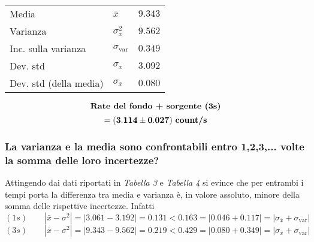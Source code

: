 \documentclass{article}
\begin{document}
\begin{minipage}[c]{0.4\textwidth}
\begin{center}
\begin{tabular}{llr}
	Media                       & $\bar{x}$             & $9.343$       \\		
	Varianza                    & $\sigma_{x}^2$          & $9.562$     \\
	Inc. sulla varianza   & $\sigma_{\text{var}}$   & $0.349$		 \\
	Dev. std                    & $\sigma_{x}$              & $3.092$   \\
	Dev. std (della media)      & $\sigma_{\bar{x}}$    & $0.080$       \\
\end{tabular}
\end{center}
\vspace{1cm}
\[ 
	\text{\textbf{Rate del fondo + sorgente (3s)}}
\]
\[
	\mathbf{=  \left(3.114 \pm 0.027\right)} \text{ \textbf{count/s}}
\]
\end{minipage}
\hfill
\begin{minipage}[c]{0.6\textwidth}
\begin{center}
\end{center}
\end{minipage}


\subsubsection*{La varianza e la media sono confrontabili entro 1,2,3,... volte la somma delle loro incertezze?}
Attingendo dai dati riportati in \textit{Tabella 3} e \textit{Tabella 4} si evince che per entrambi i tempi porta la differenza tra media e varianza è, in valore assoluto, minore della somma delle rispettive incertezze. Infatti
\[
	(1s) \qquad |\bar{x} - \sigma^2| = 	|3.061 - 3.192| = \mathbf{0.131  < 0.163} = |0.046 + 0.117| =|\sigma_{\bar{x}} + \sigma_{\text{var}}| 
\]
\[
	(3s) \qquad |\bar{x} - \sigma^2| = 	|9.343 - 9.562| = \mathbf{0.219  < 0.429} = |0.080 + 0.349| =|\sigma_{\bar{x}} + \sigma_{\text{var}}| 
\]
\end{document}
